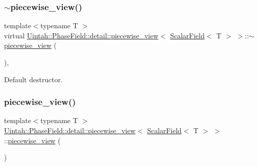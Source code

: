\subsubsection{\texorpdfstring{$\sim$piecewise\+\_\+view()}{~piecewise\_view()}}
{\footnotesize\ttfamily template$<$typename T $>$ \\
virtual \hyperlink{classUintah_1_1PhaseField_1_1detail_1_1piecewise__view}{Uintah\+::\+Phase\+Field\+::detail\+::piecewise\+\_\+view}$<$ \hyperlink{structUintah_1_1PhaseField_1_1ScalarField}{Scalar\+Field}$<$ T $>$ $>$\+::$\sim$\hyperlink{classUintah_1_1PhaseField_1_1detail_1_1piecewise__view}{piecewise\+\_\+view} (\begin{DoxyParamCaption}{ }\end{DoxyParamCaption})\hspace{0.3cm}{\ttfamily [virtual]}, {\ttfamily [default]}}



Default destructor. 

\mbox{\label{classUintah_1_1PhaseField_1_1detail_1_1piecewise__view_3_01ScalarField_3_01T_01_4_01_4_ae009d9a76c018a8056210f9ffa83582b}} 
\subsubsection{\texorpdfstring{piecewise\+\_\+view()}{piecewise\_view()}\hspace{0.1cm}{\footnotesize\ttfamily [3/3]}}
{\footnotesize\ttfamily template$<$typename T $>$ \\
\hyperlink{classUintah_1_1PhaseField_1_1detail_1_1piecewise__view}{Uintah\+::\+Phase\+Field\+::detail\+::piecewise\+\_\+view}$<$ \hyperlink{structUintah_1_1PhaseField_1_1ScalarField}{Scalar\+Field}$<$ T $>$ $>$\+::\hyperlink{classUintah_1_1PhaseField_1_1detail_1_1piecewise__view}{piecewise\+\_\+view} (\begin{DoxyParamCaption}\item[{const \hyperlink{classUintah_1_1PhaseField_1_1detail_1_1piecewise__view}{piecewise\+\_\+view}$<$ \hyperlink{structUintah_1_1PhaseField_1_1ScalarField}{Scalar\+Field}$<$ T $>$ $>$ \&}]{ }\end{DoxyParamCaption})\hspace{0.3cm}{\ttfamily [delete]}}




